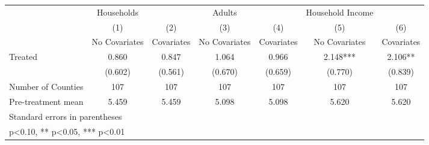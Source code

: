 {
\def\sym#1{\ifmmode^{#1}\else\(^{#1}\)\fi}
\begin{tabular}{l*{6}{c}}
\hline\hline
            &  Households   &               &      Adults   &               &Household Income   &               \\
            &\multicolumn{1}{c}{(1)}&\multicolumn{1}{c}{(2)}&\multicolumn{1}{c}{(3)}&\multicolumn{1}{c}{(4)}&\multicolumn{1}{c}{(5)}&\multicolumn{1}{c}{(6)}\\
            &\multicolumn{1}{c}{No Covariates}&\multicolumn{1}{c}{Covariates}&\multicolumn{1}{c}{No Covariates}&\multicolumn{1}{c}{Covariates}&\multicolumn{1}{c}{No Covariates}&\multicolumn{1}{c}{Covariates}\\
\hline
Treated     &       0.860   &       0.847   &       1.064   &       0.966   &       2.148***&       2.106** \\
            &     (0.602)   &     (0.561)   &     (0.670)   &     (0.659)   &     (0.770)   &     (0.839)   \\
\hline
Number of Counties&         107   &         107   &         107   &         107   &         107   &         107   \\
Pre-treatment mean&       5.459   &       5.459   &       5.098   &       5.098   &       5.620   &       5.620   \\
\hline\hline
\multicolumn{7}{l}{\footnotesize Standard errors in parentheses}\\
\multicolumn{7}{l}{\footnotesize * p<0.10, ** p<0.05, *** p<0.01}\\
\end{tabular}
}
